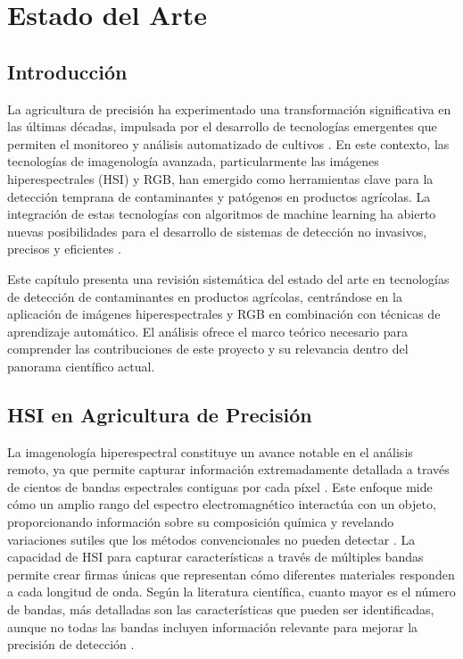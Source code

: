 \chapter{Estado del Arte}

\section{Introducción}

La agricultura de precisión ha experimentado una transformación significativa en las últimas décadas, impulsada por el desarrollo de tecnologías emergentes que permiten el monitoreo y análisis automatizado de cultivos \cite{CISTERNAS2020105626}. En este contexto, las tecnologías de imagenología avanzada, particularmente las imágenes hiperespectrales (HSI) y RGB, han emergido como herramientas clave para la detección temprana de contaminantes y patógenos en productos agrícolas. La integración de estas tecnologías con algoritmos de machine learning ha abierto nuevas posibilidades para el desarrollo de sistemas de detección no invasivos, precisos y eficientes \cite{jimaging5050052, KHAN2022101678}. 
    
Este capítulo presenta una revisión sistemática del estado del arte en tecnologías de detección de contaminantes en productos agrícolas, centrándose en la aplicación de imágenes hiperespectrales y RGB en combinación con técnicas de aprendizaje automático. El análisis ofrece el marco teórico necesario para comprender las contribuciones de este proyecto y su relevancia dentro del panorama científico actual.

\section{HSI en Agricultura de Precisión}

La imagenología hiperespectral constituye un avance notable en el análisis remoto, ya que permite capturar información extremadamente detallada a través de cientos de bandas espectrales contiguas por cada píxel \cite{article}. Este enfoque mide cómo un amplio rango del espectro electromagnético interactúa con un objeto, proporcionando información sobre su composición química y revelando variaciones sutiles que los métodos convencionales no pueden detectar \cite{WIEME2022156}. La capacidad de HSI para capturar características a través de múltiples bandas permite crear firmas únicas que representan cómo diferentes materiales responden a cada longitud de onda. Según la literatura científica, cuanto mayor es el número de bandas, más detalladas son las características que pueden ser identificadas, aunque no todas las bandas incluyen información relevante para mejorar la precisión de detección \cite{HONG201935}.

